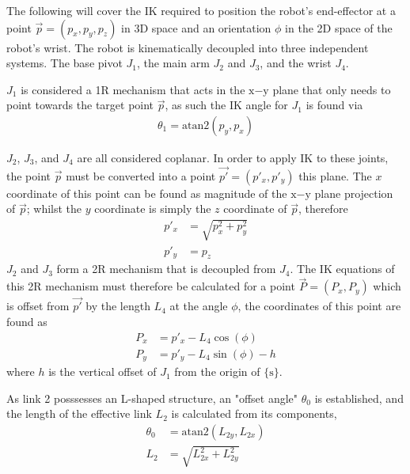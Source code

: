 \documentclass[a4paper,11pt]{article}
\begin{document}
The following will cover the IK required to position the robot's end-effector at a point $\vec{p} = (p_{x},p_{y},p_{z})$ in 3D space and an orientation $\phi$ in the 2D space of the robot's wrist. The robot is kinematically decoupled into three independent systems. The base pivot $J_{1}$, the main arm $J_{2}$ and $J_{3}$, and the wrist $J_{4}$.

$J_{1}$ is considered a 1R mechanism that acts in the $\mathrm{x}\mathrm{-}\mathrm{y}$ plane that only needs to point towards the target point $\vec{p}$, as such the IK angle for $J_{1}$ is found via
\begin{align*}
    \theta_{1} = \mathrm{atan2}(p_{y},p_{x})
\end{align*}

$J_{2}$, $J_{3}$, and $J_{4}$ are all considered coplanar. In order to apply IK to these joints, the point $\vec{p}$ must be converted into a point $\vec{p'} = (p'_{x}, p'_{y})$ this plane. The $x$ coordinate of this point can be found as magnitude of the $\mathrm{x}\mathrm{-}\mathrm{y}$ plane projection of $\vec{p}$; whilst the $y$ coordinate is simply the $z$ coordinate of $\vec{p}$, therefore
\begin{align*}
    p'_{x} &= \sqrt{ p_{x}^2 + p_{y}^2 } \\
    p'_{y} &= p_{z}
\end{align*}
$J_{2}$ and $J_{3}$ form a 2R mechanism that is decoupled from $J_{4}$. The IK equations of this 2R mechanism must therefore be calculated for a point $\vec{P} = (P_{x}, P_{y})$ which is offset from $\vec{p'}$ by the length $L_{4}$ at the angle $\phi$, the coordinates of this point are found as
\begin{align*}
    P_{x} &= p'_{x} - L_{4}\cos(\phi) \\
    P_{y} &= p'_{y} - L_{4}\sin(\phi) - h
\end{align*}
where $h$ is the vertical offset of $J_{1}$ from the origin of $\{\mathrm{s}\}$.

As link 2 posssesses an L-shaped structure, an "offset angle" $\theta_{0}$ is established, and the length of the effective link $L_{2}$ is calculated from its components,
\begin{align*}
    \theta_0 &= \mathrm{atan2}(L_{2y}, L_{2x}) \\
    L_{2} &= \sqrt{ L_{2x}^2 + L_{2y}^2 }
\end{align*}
\end{document}

